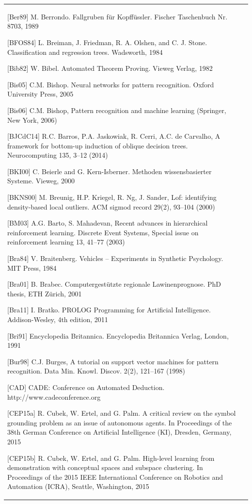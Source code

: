 \documentclass[10pt]{book}
\begin{document}
\begin{tabular}{|l|l|}
[Ber89] M. Berrondo. Fallgruben für Kopffüssler. Fischer Taschenbuch Nr. 8703, 1989

[BFOS84] L. Breiman, J. Friedman, R. A. Olshen, and C. J. Stone. Classification and regression trees. Wadsworth, 1984

[Bib82] W. Bibel. Automated Theorem Proving. Vieweg Verlag, 1982

[Bis05] C.M. Bishop. Neural networks for pattern recognition. Oxford University Press, 2005

[Bis06] C.M. Bishop, Pattern recognition and machine learning (Springer, New York, 2006)

[BJCdC14] R.C. Barros, P.A. Jaskowiak, R. Cerri, A.C. de Carvalho, A framework for bottom-up induction of oblique decision trees. Neurocomputing 135, 3–12 (2014)

[BKI00] C. Beierle and G. Kern-Isberner. Methoden wissensbasierter Systeme. Vieweg, 2000

[BKNS00] M. Breunig, H.P. Kriegel, R. Ng, J. Sander, Lof: identifying density-based local outliers. ACM sigmod record 29(2), 93–104 (2000)

[BM03] A.G. Barto, S. Mahadevan, Recent advances in hierarchical reinforcement learning. Discrete Event Systems, Special issue on reinforcement learning 13, 41–77 (2003)

[Bra84] V. Braitenberg. Vehicles – Experiments in Synthetic Psychology. MIT Press, 1984

[Bra01] B. Brabec. Computergestützte regionale Lawinenprognose. PhD thesis, ETH Zürich, 2001

[Bra11] I. Bratko. PROLOG Programming for Artificial Intelligence. Addison-Wesley, 4th edition, 2011

[Bri91] Encyclopedia Britannica. Encyclopedia Britannica Verlag, London, 1991

[Bur98] C.J. Burges, A tutorial on support vector machines for pattern recognition. Data Min. Knowl. Discov. 2(2), 121–167 (1998)

[CAD] CADE: Conference on Automated Deduction. http://www.cadeconference.org

[CEP15a] R. Cubek, W. Ertel, and G. Palm. A critical review on the symbol grounding problem as an issue of autonomous agents. In Proceedings of the 38th German Conference on Artificial Intelligence (KI), Dresden, Germany, 2015

[CEP15b] R. Cubek, W. Ertel, and G. Palm. High-level learning from demonstration with conceptual spaces and subspace clustering. In Proceedings of the 2015 IEEE International Conference on Robotics and Automation (ICRA), Seattle, Washington, 2015


\end{tabular}
\end{document}
